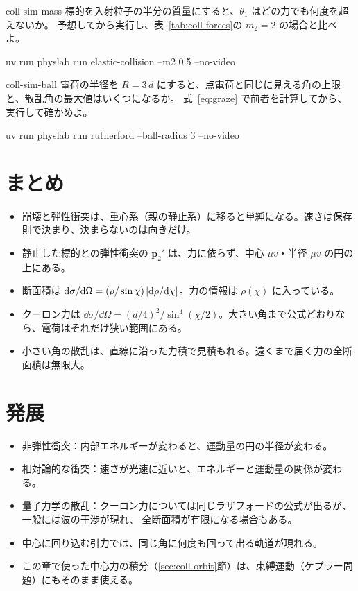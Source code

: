 \begin{exercise}[シミュレーション]{coll-sim-mass}
標的を入射粒子の半分の質量にすると、$\theta_1$ はどの力でも何度を超えないか。
予想してから実行し、表~\ref{tab:coll-forces}の $m_2=2$ の場合と比べよ。
\begin{terminal}
uv run physlab run elastic-collision --m2 0.5 --no-video
\end{terminal}
\end{exercise}

\begin{exercise}[シミュレーション]{coll-sim-ball}
電荷の半径を $R=3\,d$ にすると、点電荷と同じに見える角の上限と、散乱角の最大値はいくつになるか。
式~\eqref{eq:graze} で前者を計算してから、実行して確かめよ。
\begin{terminal}
uv run physlab run rutherford --ball-radius 3 --no-video
\end{terminal}
\end{exercise}

\section{まとめ}\label{sec:coll-summary}

\begin{summary}
\begin{itemize}
  \item 崩壊と弾性衝突は、重心系（親の静止系）に移ると単純になる。速さは保存則で決まり、決まらないのは向きだけ。
  \item 静止した標的との弾性衝突の $\bm p_2'$ は、力に依らず、中心 $\mu v$・半径 $\mu v$ の円の上にある。
  \item 断面積は $\mathrm{d}\sigma/\mathrm{d}\Omega=(\rho/\sin\chi)\left\lvert \mathrm{d}\rho/\mathrm{d}\chi\right\rvert$。力の情報は $\rho(\chi)$ に入っている。
  \item クーロン力は $\dd\sigma/\dd\Omega=(d/4)^2/\sin^4(\chi/2)$。大きい角まで公式どおりなら、電荷はそれだけ狭い範囲にある。
  \item 小さい角の散乱は、直線に沿った力積で見積もれる。遠くまで届く力の全断面積は無限大。
\end{itemize}
\end{summary}

\section{発展}\label{sec:coll-advanced}
\begin{itemize}
  \item 非弾性衝突：内部エネルギーが変わると、運動量の円の半径が変わる。
  \item 相対論的な衝突：速さが光速に近いと、エネルギーと運動量の関係が変わる。
  \item 量子力学の散乱：クーロン力については同じラザフォードの公式が出るが、一般には波の干渉が現れ、
    全断面積が有限になる場合もある。
  \item 中心に回り込む引力では、同じ角に何度も回って出る軌道が現れる。
  \item この章で使った中心力の積分（\ref{sec:coll-orbit}節）は、束縛運動（ケプラー問題）にもそのまま使える。
\end{itemize}

